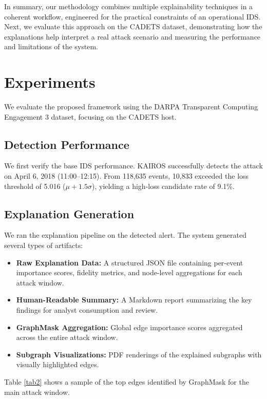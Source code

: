 \documentclass[conference]{IEEEtran}
\begin{document}
In summary, our methodology combines multiple explainability techniques in a coherent workflow, engineered for the practical constraints of an operational IDS. Next, we evaluate this approach on the CADETS dataset, demonstrating how the explanations help interpret a real attack scenario and measuring the performance and limitations of the system.

\section{Experiments}
We evaluate the proposed framework using the DARPA Transparent Computing Engagement 3 dataset, focusing on the CADETS host.

\subsection{Detection Performance}
We first verify the base IDS performance. KAIROS successfully detects the attack on April 6, 2018 (11:00--12:15). From 118,635 events, 10,833 exceeded the loss threshold of 5.016 ($\mu + 1.5\sigma$), yielding a high-loss candidate rate of 9.1\%.

\subsection{Explanation Generation}
We ran the explanation pipeline on the detected alert. The system generated several types of artifacts:
\begin{itemize}
    \item \textbf{Raw Explanation Data:} A structured JSON file containing per-event importance scores, fidelity metrics, and node-level aggregations for each attack window.
    \item \textbf{Human-Readable Summary:} A Markdown report summarizing the key findings for analyst consumption and review.
    \item \textbf{GraphMask Aggregation:} Global edge importance scores aggregated across the entire attack window.
    \item \textbf{Subgraph Visualizations:} PDF renderings of the explained subgraphs with visually highlighted edges.
\end{itemize}

Table \ref{tab2} shows a sample of the top edges identified by GraphMask for the main attack window.
\end{document}
